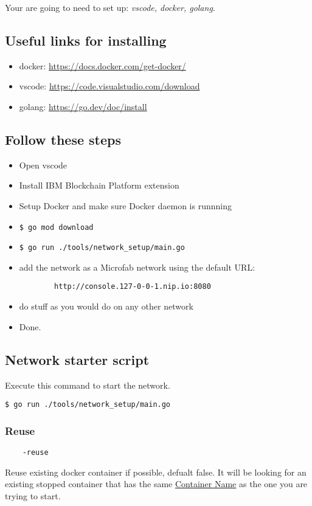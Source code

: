 Your are going to need to set up: \emph{vscode, docker, golang}.
\subsection{Useful links for installing}
\begin{itemize}
    \item docker: \href{https://docs.docker.com/get-docker/}{https://docs.docker.com/get-docker/}
    \item vscode: \href{https://code.visualstudio.com/download}{https://code.visualstudio.com/download}
    \item golang: \href{https://go.dev/doc/install}{https://go.dev/doc/install}
\end{itemize}
\subsection{Follow these steps}
\begin{itemize}
    \item Open vscode
    \item Install IBM Blockchain Platform extension
    \item Setup Docker and make sure Docker daemon is runnning
    \item \begin{verbatim}$ go mod download\end{verbatim}
    \item \begin{verbatim}$ go run ./tools/network_setup/main.go\end{verbatim}
    \item add the network as a Microfab network using the default URL: \begin{verbatim}
        http://console.127-0-0-1.nip.io:8080
    \end{verbatim}
    \item do stuff as you would do on any other network
    \item Done.
\end{itemize}

\subsection{Network starter script}
Execute this command to start the network.
\begin{verbatim}$ go run ./tools/network_setup/main.go\end{verbatim}
\subsubsection{Reuse}
\begin{verbatim}
    -reuse
\end{verbatim}
Reuse existing docker container if possible, defualt false. It will be looking for an existing stopped container that has the same \hyperref[ref:ContainerName]{Container Name} as the one you are trying to start.

